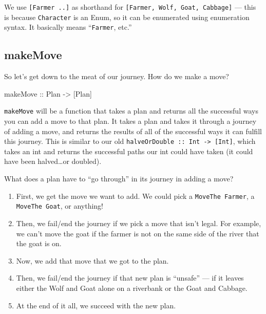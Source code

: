 \documentclass[]{article}
\newenvironment{Shaded}{}{}
\newcommand{\DataTypeTok}[1]{\textcolor[rgb]{0.56,0.13,0.00}{{#1}}}
\newcommand{\OtherTok}[1]{\textcolor[rgb]{0.00,0.44,0.13}{{#1}}}
\newcommand{\NormalTok}[1]{{#1}}
\begin{document}
We use \texttt{{[}Farmer\ ..{]}} as shorthand for
\texttt{{[}Farmer,\ Wolf,\ Goat,\ Cabbage{]}} --- this is because
\texttt{Character} is an Enum, so it can be enumerated using enumeration syntax.
It basically means ``\texttt{Farmer}, etc.''

\subsection{makeMove}\label{makemove}

So let's get down to the meat of our journey. How do we make a move?

\begin{Shaded}
\begin{Highlighting}[]
\OtherTok{makeMove ::} \DataTypeTok{Plan} \OtherTok{->} \NormalTok{[}\DataTypeTok{Plan}\NormalTok{]}
\end{Highlighting}
\end{Shaded}

\texttt{makeMove} will be a function that takes a plan and returns all the
successful ways you can add a move to that plan. It takes a plan and takes it
through a journey of adding a move, and returns the results of all of the
successful ways it can fulfill this journey. This is similar to our old
\texttt{halveOrDouble\ ::\ Int\ -\textgreater{}\ {[}Int{]}}, which takes an int
and returns the successful paths our int could have taken (it could have been
halved\ldots{}or doubled).

What does a plan have to ``go through'' in its journey in adding a move?

\begin{enumerate}
\def\labelenumi{\arabic{enumi}.}
\tightlist
\item
  First, we get the move we want to add. We could pick a
  \texttt{MoveThe\ Farmer}, a \texttt{MoveThe\ Goat}, or anything!
\item
  Then, we fail/end the journey if we pick a move that isn't legal. For example,
  we can't move the goat if the farmer is not on the same side of the river that
  the goat is on.
\item
  Now, we add that move that we got to the plan.
\item
  Then, we fail/end the journey if that new plan is ``unsafe'' --- if it leaves
  either the Wolf and Goat alone on a riverbank or the Goat and Cabbage.
\item
  At the end of it all, we succeed with the new plan.
\end{enumerate}
\end{document}
